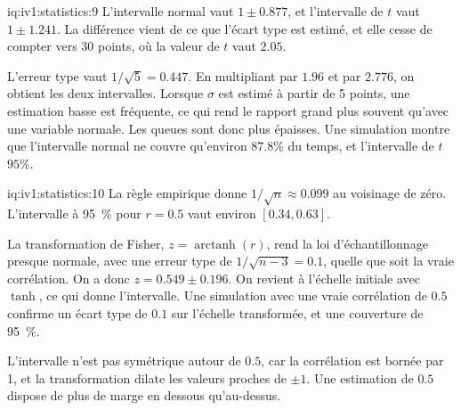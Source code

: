 \begin{solution}{iq:iv1:statistics:9}
L'intervalle normal vaut $1 \pm 0.877$, et l'intervalle de $t$ vaut $1 \pm 1.241$. La différence vient de ce que l'écart type est estimé, et elle cesse de compter vers 30 points, où la valeur de $t$ vaut $2.05$.

L'erreur type vaut $1/\sqrt{5} = 0.447$. En multipliant par $1.96$ et par $2.776$, on obtient les deux intervalles. Lorsque $\sigma$ est estimé à partir de 5 points, une estimation basse est fréquente, ce qui rend le rapport grand plus souvent qu'avec une variable normale. Les queues sont donc plus épaisses. Une simulation montre que l'intervalle normal ne couvre qu'environ $87.8\%$ du temps, et l'intervalle de $t$ $95\%$.

\end{solution}

\begin{solution}{iq:iv1:statistics:10}
La règle empirique donne $1/\sqrt{n} \approx 0.099$ au voisinage de zéro. L'intervalle à 95~\% pour $r = 0.5$ vaut environ $[0.34, 0.63]$.

La transformation de Fisher, $z = \operatorname{arctanh}(r)$, rend la loi d'échantillonnage presque normale, avec une erreur type de $1/\sqrt{n - 3} = 0.1$, quelle que soit la vraie corrélation. On a donc $z = 0.549 \pm 0.196$. On revient à l'échelle initiale avec $\tanh$, ce qui donne l'intervalle. Une simulation avec une vraie corrélation de $0.5$ confirme un écart type de $0.1$ sur l'échelle transformée, et une couverture de 95~\%.

L'intervalle n'est pas symétrique autour de $0.5$, car la corrélation est bornée par 1, et la transformation dilate les valeurs proches de $\pm 1$. Une estimation de $0.5$ dispose de plus de marge en dessous qu'au-dessus.

\end{solution}

